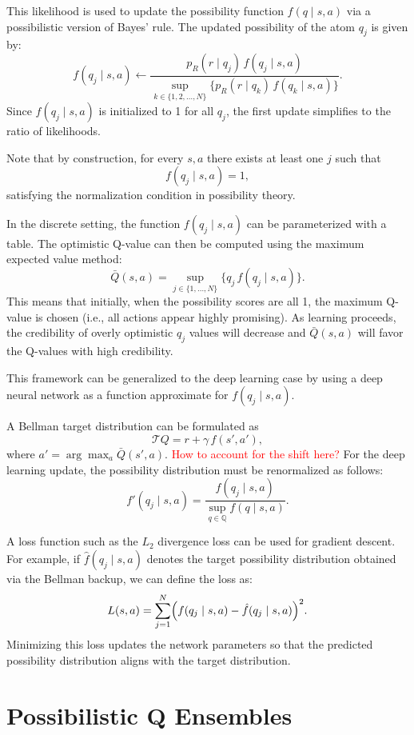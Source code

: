 \documentclass[12pt,a4paper]{report}
\newcommand\myworries[1]{\textcolor{red}{#1}}
\begin{document}
This likelihood is used to update the possibility function \( f(q \mid s, a) \) via a possibilistic version of Bayes' rule. The updated possibility of the atom \(q_j\) is given by:
\[
f(q_j \mid s, a) \leftarrow \frac{p_R(r \mid q_j)\, f(q_j \mid s, a)}{\displaystyle \sup_{k \in \{1, 2, \dots, N\}} \bigl\{p_R(r \mid q_k)\, f(q_k \mid s, a)\bigr\}}.
\]
Since \( f(q_j \mid s, a) \) is initialized to 1 for all \(q_j\), the first update simplifies to the ratio of likelihoods.

Note that by construction, for every \(s,a\) there exists at least one \(j\) such that 
\[
f(q_j \mid s, a) = 1,
\]
satisfying the normalization condition in possibility theory.

In the discrete setting, the function \( f(q_j \mid s, a) \) can be parameterized with a table. The optimistic Q-value can then be computed using the maximum expected value method:
\[
\bar{Q}(s, a) = \sup_{j \in \{1, \dots, N\}} \{q_j\, f(q_j \mid s, a)\}.
\]
This means that initially, when the possibility scores are all 1, the maximum Q-value is chosen (i.e., all actions appear highly promising). As learning proceeds, the credibility of overly optimistic \(q_j\) values will decrease and \(\bar{Q}(s,a)\) will favor the Q-values with high credibility.

This framework can be generalized to the deep learning case by using a deep neural network as a function approximate for \( f(q_j \mid s, a) \).

A Bellman target distribution can be formulated as
\[
\mathcal{T}Q = r + \gamma\, f(s', a'),
\]
where \( a' = \arg\max_{a} \bar{Q}(s',a) \). \myworries{How to account for the shift here?} For the deep learning update, the possibility distribution must be renormalized as follows:
\[
f'(q_j \mid s, a ) = \frac{f(q_j \mid s, a)}{\displaystyle \sup_{q \in \mathbb{Q}} f(q \mid s, a)}.
\]

A loss function such as the \(L_2\) divergence loss can be used for gradient descent. For example, if \(\hat{f}(q_j \mid s, a)\) denotes the target possibility distribution obtained via the Bellman backup, we can define the loss as:
\[
L(s,a) = \sum_{j=1}^{N} \Bigl( f(q_j \mid s, a) - \hat{f}(q_j \mid s, a) \Bigr)^2.
\]
Minimizing this loss updates the network parameters so that the predicted possibility distribution aligns with the target distribution.


\chapter{Possibilistic Q Ensembles}
\end{document}
